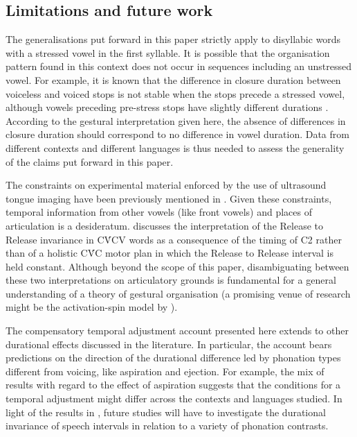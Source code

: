 \documentclass[preprint]{JASAnew}
\begin{document}
\subsection{Limitations and future
work}\label{limitations-and-future-work}

The generalisations put forward in this paper strictly apply to
disyllabic words with a stressed vowel in the first syllable. It is
possible that the organisation pattern found in this context does not
occur in sequences including an unstressed vowel. For example, it is
known that the difference in closure duration between voiceless and
voiced stops is not stable when the stops precede a stressed vowel,
although vowels preceding pre-stress stops have slightly different
durations \citep{davis1989}. According to the gestural interpretation
given here, the absence of differences in closure duration should
correspond to no difference in vowel duration. Data from different
contexts and different languages is thus needed to assess the generality
of the claims put forward in this paper.

The constraints on experimental material enforced by the use of
ultrasound tongue imaging have been previously mentioned in
. Given these constraints, temporal information from
other vowels (like front vowels) and places of articulation is a
desideratum.  discusses the interpretation of the
Release to Release invariance in CV́CV words as a consequence of the
timing of C2 rather than of a holistic CV́C motor plan in which the
Release to Release interval is held constant. Although beyond the scope
of this paper, disambiguating between these two interpretations on
articulatory grounds is fundamental for a general understanding of a
theory of gestural organisation (a promising venue of research might be
the activation-spin model by \citealt{tilsen2013}).

The compensatory temporal adjustment account presented here extends to
other durational effects discussed in the literature. In particular, the
account bears predictions on the direction of the durational difference
led by phonation types different from voicing, like aspiration and
ejection. For example, the mix of results with regard to the effect of
aspiration \citep{durvasula2012} suggests that the conditions for a
temporal adjustment might differ across the contexts and languages
studied. In light of the results in \citet{begus2017}, future studies
will have to investigate the durational invariance of speech intervals
in relation to a variety of phonation contrasts.
\end{document}
